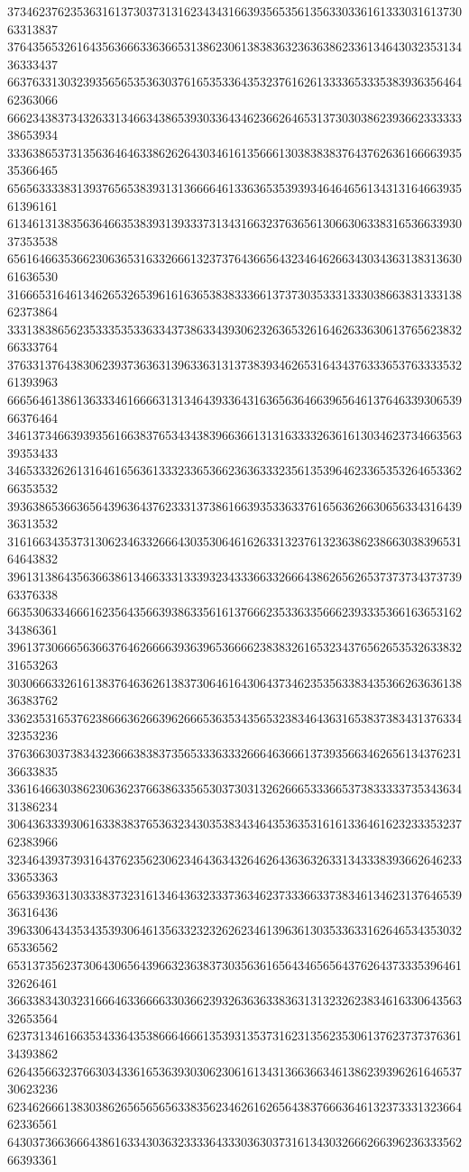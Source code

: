 37346237623536316137303731316234343166393565356135633033616133303161373063313837
37643565326164356366633636653138623061383836323636386233613464303235313436333437
66376331303239356565353630376165353364353237616261333365333538393635646462363066
66623438373432633134663438653930336434623662646531373030386239366233333338653934
33363865373135636464633862626430346161356661303838383764376263616666393535366465
65656333383139376565383931313666646133636535393934646465613431316466393561396161
61346131383563646635383931393337313431663237636561306630633831653663393037353538
65616466353662306365316332666132373764366564323464626634303436313831363061636530
31666531646134626532653961616365383833366137373035333133303866383133313862373864
33313838656235333535336334373863343930623263653261646263363061376562383266333764
37633137643830623937363631396336313137383934626531643437633365376333353261393963
66656461386136333461666631313464393364316365636466396564613764633930653966376464
34613734663939356166383765343438396636613131633332636161303462373466356339353433
34653332626131646165636133323365366236363332356135396462336535326465336266353532
39363865366365643963643762333137386166393533633761656362663065633431643936313532
31616634353731306234633266643035306461626331323761323638623866303839653164643832
39613138643563663861346633313339323433366332666438626562653737373437373963376338
66353063346661623564356639386335616137666235336335666239333536616365316234386361
39613730666563663764626666393639653666623838326165323437656265353263383231653263
30306663326161383764636261383730646164306437346235356338343536626363613836383762
33623531653762386663626639626665363534356532383464363165383738343137633432353236
37636630373834323666383837356533363332666463666137393566346265613437623136633835
33616466303862306362376638633565303730313262666533366537383333373534363431386234
30643633393061633838376536323430353834346435363531616133646162323335323762383966
32346439373931643762356230623464363432646264363632633134333839366264623333653363
65633936313033383732316134643632333736346237333663373834613462313764653936316436
39633064343534353930646135633232326262346139636130353363316264653435303265336562
65313735623730643065643966323638373035636165643465656437626437333539646132626461
36633834303231666463366663303662393263636338363131323262383461633064356332653564
62373134616635343364353866646661353931353731623135623530613762373737636134393862
62643566323766303433616536393030623061613431366366346138623939626164653730623236
62346266613830386265656565633835623462616265643837666364613237333132366462336561
64303736636664386163343036323333643330363037316134303266626639623633356266393361
